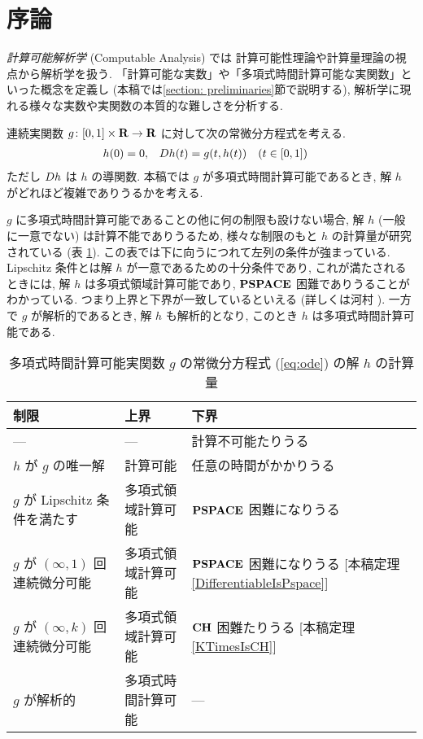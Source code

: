 \section{序論}

\emph{計算可能解析学} (Computable Analysis) \cite{weihrauch00:_comput_analy} では
計算可能性理論や計算量理論の視点から解析学を扱う. 
「計算可能な実数」や「多項式時間計算可能な実関数」といった概念を定義し
(本稿では\ref{section: preliminaries}節で説明する), 
解析学に現れる様々な実数や実関数の本質的な難しさを分析する. 

連続実関数 $g \colon [0,1] \times \mathbf R \to \mathbf R$ に対して次の常微分方程式を考える. 
\begin{align}
 \label{eq:ode}
 h(0) & = 0, &
 D h(t) & = g(t,h(t)) \quad (t \in [0,1])
\end{align}
ただし $D h$ は $h$ の導関数.
本稿では $g$ が多項式時間計算可能であるとき, 
解 $h$ がどれほど複雑でありうるかを考える.

$g$ に多項式時間計算可能であることの他に何の制限も設けない場合, 
解 $h$ (一般に一意でない) は計算不能でありうるため,
様々な制限のもと $h$ の計算量が研究されている (表 \ref{table:related}).
この表では下に向うにつれて左列の条件が強まっている. 
Lipschitz 条件とは解 $h$ が一意であるための十分条件であり, 
これが満たされるときには, 解 $h$ は多項式領域計算可能であり, 
$\mathbf{PSPACE}$ 困難でありうることがわかっている. 
つまり上界と下界が一致しているといえる (詳しくは河村 \cite{kawamura2010lipschitz}).
一方で $g$ が解析的であるとき, 解 $h$ も解析的となり, 
このとき $h$ は多項式時間計算可能である.


\begin{table}
\renewcommand\arraystretch{1.3}
\begin{center}
 \caption{多項式時間計算可能実関数 $g$ の常微分方程式 (\ref{eq:ode}) の解 $h$ の計算量}
 \label{table:related}
 \begin{tabular}{lll}
  制限 & 上界 & 下界 \\
  \hline
   --- & --- & 計算不可能たりうる \cite{pour1979computable} \\
  $h$ が $g$ の唯一解 & 計算可能 \cite{coddington1955theory}
  & 任意の時間がかかりうる \cite{ko1983computational, miller1970recursive} \\
  $g$ が Lipschitz 条件を満たす & 多項式領域計算可能 \cite{ko1983computational}
      &	$\mathbf{PSPACE}$ 困難になりうる \cite{kawamura2010lipschitz}\\
  $g$ が $(\infty, 1)$ 回連続微分可能 & 多項式領域計算可能 & \parbox[t]{14zw}{$\mathbf{PSPACE}$ 困難になりうる\\{}[本稿定理\ref{DifferentiableIsPspace}]} \\
  $g$ が $(\infty, k)$ 回連続微分可能 & 多項式領域計算可能 & \parbox[t]{14zw}{$\mathbf{CH}$ 困難たりうる\\{}[本稿定理\ref{KTimesIsCH}]} \\
  $g$ が解析的 
  & 多項式時間計算可能 \cite{muller1987uniform, ko1988computing, kawamura2010complexity} 
  & ---
 \end{tabular}
\end{center}
\end{table}

